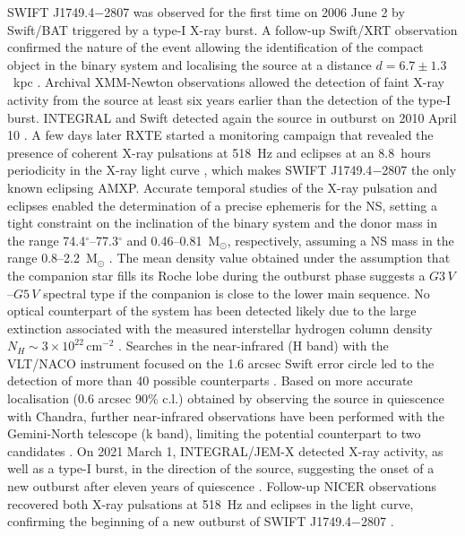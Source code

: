 \documentclass[fleqn,usenatbib]{mnras}
\newcommand{\swiftj}{SWIFT J1749.4$-$2807}
\newcommand{\nicer}{NICER}
\newcommand{\xmm}{XMM-Newton}
\newcommand{\rxte}{RXTE}
\newcommand{\chandra}{Chandra}
\newcommand{\swift}{Swift}
\newcommand{\inte}{INTEGRAL}
\begin{document}
\swiftj{} was observed for the first time on 2006 June 2 by \swift{}/BAT \citep{Schady2006} triggered by a type-I X-ray burst. A follow-up \swift{}/XRT observation confirmed the nature of the event allowing the identification of the compact object in the binary system and localising the source at a distance $d=6.7\pm1.3$~kpc \citep[however, no sign of photospheric radius expansion was detected for this type-I burst, therefore this value should be considered as an upper limit][]{Wijnands:2009wa,Campana:2009va}. Archival \xmm{} observations allowed the detection of faint X-ray activity from the source at least six years earlier than the detection of the type-I burst. 
\inte{} and \swift{} detected again the source in outburst on 2010 April 10 \citep{Pavan2010,Chenevez2010}. A few days later \rxte{} started a monitoring campaign that revealed the presence of coherent X-ray pulsations at 518~Hz \citep{Altamirano2010} and eclipses at an 8.8~hours periodicity in the X-ray light curve \citep{Markwardt2010}, which makes \swiftj{} the only known eclipsing AMXP. Accurate temporal studies of the X-ray pulsation and eclipses enabled the determination of a precise ephemeris for the NS, setting a tight constraint on the inclination of the binary system and the donor mass in the range 74.4$^\circ$--77.3$^\circ$ and 0.46--0.81~M$_\odot$, respectively, assuming a NS mass in the range 0.8--2.2~M$_\odot$ \citep[][]{Markwardt:2010tl,Altamirano:2011uq}. The mean density value obtained under the assumption that the companion star fills its Roche lobe during the outburst phase suggests a $G3\,V$--$G5\,V$ spectral type if the companion is close to the lower main sequence. No optical counterpart of the system has been detected likely due to the large extinction associated with the measured interstellar hydrogen column density $N_H\sim3 \times 10^{22}\,\text{cm}^{-2}$ \citep{Ferrigno:2011wz}. Searches in the near-infrared (H band) with the VLT/NACO instrument focused on the 1.6 arcsec \swift{} error circle led to the detection of more than 40 possible counterparts \citep{DAvanzo:2011tq}. Based on more accurate localisation (0.6 arcsec 90\% c.l.) obtained by observing the source in quiescence with \chandra{}, further near-infrared observations have been performed with the Gemini-North telescope (k band), limiting the potential counterpart to two candidates \citep{Jonker:2013wp}. 
On 2021 March 1, \inte{}/JEM-X detected X-ray activity, as well as a type-I burst, in the direction of the source, suggesting the onset of a new outburst after eleven years of quiescence \citep{Mereminskiy2021}. Follow-up \nicer{} observations recovered both X-ray pulsations at 518~Hz and eclipses in the light curve, confirming the beginning of a new outburst of \swiftj{} \citep{Bult:2021wk}.
\end{document}
